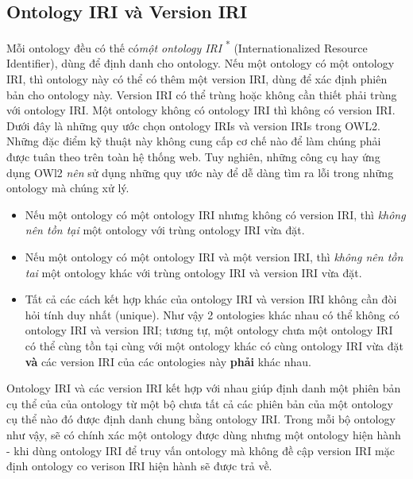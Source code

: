 \subsection{Ontology IRI và Version IRI}
Mỗi ontology đều có thế có\textit{một ontology IRI} \cite{iri} \textsuperscript{*} (Internationalized Resource Identifier), dùng để định danh cho ontology. Nếu một ontology có một ontology IRI, thì ontology này có thể có thêm một version IRI, dùng để xác định phiên bản cho ontology này. Version IRI có thể trùng hoặc không cần thiết phải trùng với ontology IRI. Một ontology không có ontology IRI thì không có version IRI.
Dưới đây là những quy ước chọn ontology IRIs và version IRIs trong OWL2. Những đặc điểm kỹ thuật này không cung cấp cơ chế nào để làm chúng phải được tuân theo trên toàn hệ thống web. Tuy nghiên, những công cụ hay ứng dụng OWl2 \textit{nên} sử dụng những quy ước này để dễ dàng tìm ra lỗi trong những ontology mà chúng xử lý.
{\let\thefootnote\relax{}
}
\begin{itemize}
\item Nếu một ontology có một ontology IRI nhưng không có version IRI, thì \textit{không nên tồn tại} một ontology với trùng ontology IRI vừa đặt.
\item Nếu một ontology có một ontology IRI và một version IRI, thì \textit{không nên tồn tai} một ontology khác với trùng ontology IRI và version IRI vừa đặt.
\item Tất cả các cách kết hợp khác của ontology IRI và version IRI không cần đòi hỏi tính duy nhất (unique). Như vậy 2 ontologies khác nhau có thể không có ontology IRI và version IRI; tương tự, một ontology chưa một ontology IRI có thể cùng tồn tại cùng với một ontology khác có cùng ontology IRI vừa đặt \textbf{và} các version IRI của các ontologies này \textbf{phải} khác nhau.
\end{itemize}
Ontology IRI và các version IRI kết hợp với nhau giúp định danh một phiên bản cụ thể của của ontology từ một bộ chưa tất cả các phiên bản của một ontology cụ thể nào đó được định danh chung bằng ontology IRI. Trong mỗi bộ ontology như vậy, sẽ có chính xác một ontology được dùng nhưng một ontology hiện hành - khi dùng ontology IRI để truy vấn ontology mà không đề cập version IRI mặc định ontology co verison IRI hiện hành sẽ được trả về.


